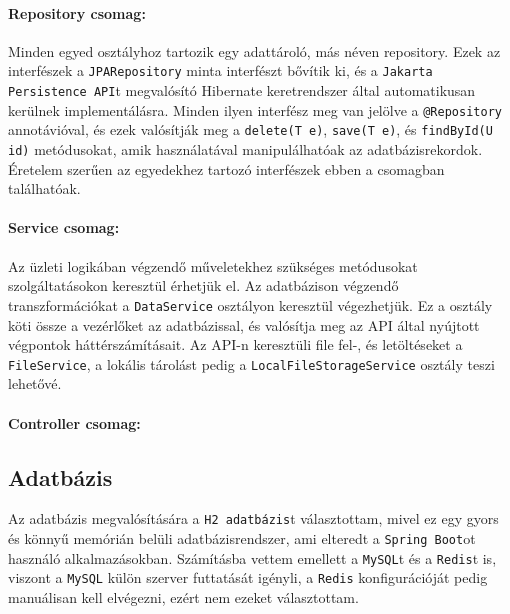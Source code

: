 \paragraph{Repository csomag: \label{par:repository}}
Minden egyed osztályhoz tartozik egy adattároló, más néven repository. Ezek az interfészek a \texttt{JPARepository} minta interfészt bővítik ki, és a \texttt{Jakarta Persistence API}t megvalósító Hibernate keretrendszer által automatikusan kerülnek implementálásra. Minden ilyen interfész meg van jelölve a \texttt{@Repository} annotávióval, és ezek valósítják meg a \texttt{delete(T e)}, \texttt{save(T e)}, és \texttt{findById(U id)} metódusokat, amik használatával manipulálhatóak az adatbázisrekordok. Éretelem szerűen az egyedekhez tartozó interfészek ebben a csomagban találhatóak.

\paragraph{Service csomag: \label{par:service}}

Az üzleti logikában végzendő műveletekhez szükséges metódusokat szolgáltatásokon keresztül érhetjük el. Az adatbázison végzendő transzformációkat a \texttt{DataService} osztályon keresztül végezhetjük. Ez a osztály köti össze a vezérlőket az adatbázissal, és valósítja meg az API által nyújtott végpontok háttérszámításait. Az API-n keresztüli file fel-, és letöltéseket a \texttt{FileService}, a lokális tárolást pedig a \texttt{LocalFileStorageService} osztály teszi lehetővé.

\paragraph{Controller csomag: \label{par:controller}}


\subsection{Adatbázis}

Az adatbázis megvalósítására a \texttt{H2 adatbázis}t választottam, mivel ez egy gyors és könnyű memórián belüli adatbázisrendszer, ami elteredt a \texttt{Spring Boot}ot használó alkalmazásokban. Számításba vettem emellett a \texttt{MySQL}t és a \texttt{Redis}t is, viszont a \texttt{MySQL} külön szerver futtatását igényli, a \texttt{Redis} konfigurációját pedig manuálisan kell elvégezni, ezért nem ezeket választottam.

